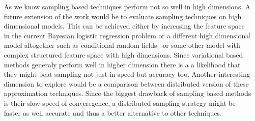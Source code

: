 As we know sampling based techniques perform not so well in high dimensions. A
future extension of the work would be to evaluate sampling techniques on high
dimensional models. This can be achieved either by increasing the feature space
in the current Bayesian logistic regression problem or a different high
dimensional model altogether such as conditional random
fields~\cite{sutton06introduction} or some
other model with complex structured feature space with high dimensions. Since
variational based methods generaly perform well in higher dimension there is a
a likelihood that they might beat sampling not just in speed but accuracy too. 
Another interesting dimension to explore would be a comparison between
distributed version of these approximation techniques. Since the biggest
drawback of sampling based methods is their slow speed of converegence, a
distributed sampling strategy might be faster as well accurate and thus a better
alternative to other techniques. 

% 
% 
